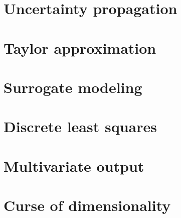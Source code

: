 \begin{refsection}


\section{Uncertainty propagation} \label{sec:Uncertainty:UncertaintyPropagation}


\section{Taylor approximation} \label{sec:Uncertainty:TaylorApproximation}


\section{Surrogate modeling} \label{sec:Uncertainty:SurrogateModeling}


\section{Discrete least squares} \label{sec:Uncertainty:LeastSquares}


\section{Multivariate output} \label{sec:Uncertainty:MultivariateOutput}


\section{Curse of dimensionality} \label{sec:Uncertainty:CurseOfDimensionality}


\printbibliography[heading=subbibliography]
\end{refsection}